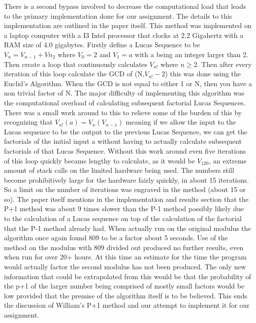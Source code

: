 \documentclass[12pt]{article} %
\begin{document}
\indent There is a second bypass involved to decrease the computational load that leads to the primary implementation done for our assignment. The details to this implementation are outlined in the paper itself. This method was implemented on a laptop computer with a I3 Intel processor that clocks at 2.2 Gigahertz with a RAM size of 4.0 gigabytes. Firstly define a Lucas Sequence to be $V_n = V_{n-1}+V{n_2}$ where $V_0 = 2$ and $V_1 = a$ with a being an integer larger than 2. Then create a loop that continuously calculates $V_{n!}$ where $n \geq 2$. Then after every iteration of this loop calculate the GCD of (N,$V_{n!}-2$) this was done using the Euclid's Algorithm. When the GCD is not equal to either 1 or N, then you have a non trivial factor of N. The major difficulty of implementing this algorithm was the computational overload of calculating subsequent factorial Lucas Sequences. There was a small work around to this to relieve some of the burden of this by recognizing that $V_{n!}(a) = V_n({V_{n-1}})$ meaning if we allow the input to the Lucas sequence to be the output to the previous Lucas Sequence, we can get the factorials of the initial input a without having to actually calculate subsequent factorials of that Lucas Sequence. Without this work around even five iterations of this loop quickly became lengthy to calculate, as it would be $V_120$, an extreme amount of stack calls on the limited hardware being used. The numbers still become prohibitively large for the hardware fairly quickly, in about 15 iterations. So a limit on the number of iterations was engraved in the method (about 15 or so). The paper itself mentions in the implementation and results section that the P+1 method was about 9 times slower than the P-1 method possibly likely due to the calculation of a Lucas sequence on top of the calculation of the factorial that the P-1 method already had. When actually run on the original modulus the algorithm once again found 809 to be a factor about 5 seconds. Use of the method on the modulus with 809 divided out produced no further results, even when run for over 20+ hours. At this time an estimate for the time the program would actually factor the second modulus has not been produced. The only new information that could be extrapolated from this would be that the probability of the p+1 of the larger number being comprised of mostly small factors would be low provided that the premise of the algorithm itself is to be believed. This ends the discussion of William's P+1 method and our attempt to implement it for our assignment. 
 
\end{document}

